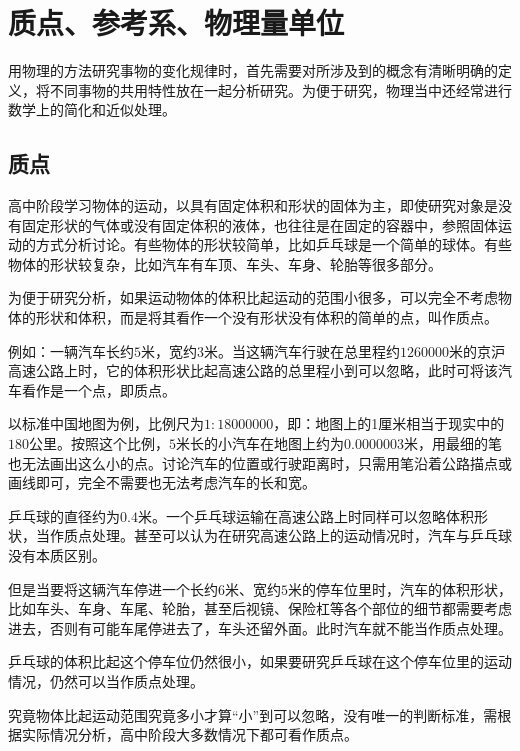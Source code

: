 \documentclass[color=blue]{textbook-cn}%
\begin{document}
\section{质点、参考系、物理量单位}


\begin{Point*}
用物理的方法研究事物的变化规律时，首先需要对所涉及到的概念有清晰明确的定义，将不同事物的共用特性放在一起分析研究。为便于研究，物理当中还经常进行数学上的简化和近似处理。
\end{Point*}

\subsection{质点}
高中阶段学习物体的运动，以具有固定体积和形状的固体为主，即使研究对象是没有固定形状的气体或没有固定体积的液体，也往往是在固定的容器中，参照固体运动的方式分析讨论。有些物体的形状较简单，比如乒乓球是一个简单的球体。有些物体的形状较复杂，比如汽车有车顶、车头、车身、轮胎等很多部分。


\begin{Definition*}[质点]
为便于研究分析，如果运动物体的体积比起运动的范围小很多，可以完全不考虑物体的形状和体积，而是将其看作一个没有形状没有体积的简单的点，叫作\textsf{质点}。
\end{Definition*}


例如：一辆汽车长约$5$米，宽约$3$米。当这辆汽车行驶在总里程约$1260000$米的京沪高速公路上时，它的体积形状比起高速公路的总里程小到可以忽略，此时可将该汽车看作是一个点，即质点。


以标准中国地图为例，比例尺为$1:18000000$，即：地图上的1厘米相当于现实中的$180$公里。按照这个比例，$5$米长的小汽车在地图上约为$0.0000003$米，用最细的笔也无法画出这么小的点。讨论汽车的位置或行驶距离时，只需用笔沿着公路描点或画线即可，完全不需要也无法考虑汽车的长和宽。


乒乓球的直径约为$0.4$米。一个乒乓球运输在高速公路上时同样可以忽略体积形状，当作质点处理。甚至可以认为在研究高速公路上的运动情况时，汽车与乒乓球没有本质区别。


但是当要将这辆汽车停进一个长约$6$米、宽约$5$米的停车位里时，汽车的体积形状，比如车头、车身、车尾、轮胎，甚至后视镜、保险杠等各个部位的细节都需要考虑进去，否则有可能车尾停进去了，车头还留外面。此时汽车就不能当作质点处理。


乒乓球的体积比起这个停车位仍然很小，如果要研究乒乓球在这个停车位里的运动情况，仍然可以当作质点处理。


究竟物体比起运动范围究竟多小才算“小”到可以忽略，没有唯一的判断标准，需根据实际情况分析，高中阶段大多数情况下都可看作质点。
\end{document}
